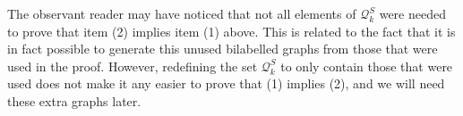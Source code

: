 \documentclass[a4paper,onecolumn,11pt,accepted=2026-01-06]{quantumarticle}
\theoremstyle{plain}
\theoremstyle{remark}
\theoremstyle{definition}
\begin{document}
The observant reader may have noticed that not all elements of $\mathcal{Q}_k^S$ were needed to prove that item (2) implies item (1) above. This is related to the fact that it is in fact possible to generate this unused bilabelled graphs from those that were used in the proof. However, redefining the set $\mathcal{Q}_k^S$ to only contain those that were used does not make it any easier to prove that (1) implies (2), and we will need these extra graphs later.






\end{document}
